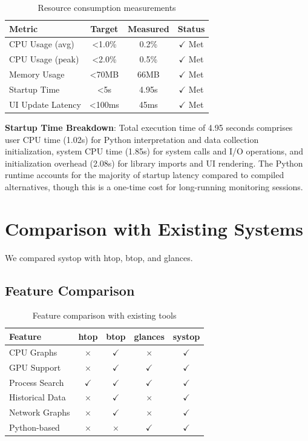 \documentclass[12pt,a4paper,oneside]{report}
\begin{document}
\begin{table}[h]
\centering
\caption{Resource consumption measurements}
\label{tab:performance}
\begin{tabular}{|l|c|c|c|}
\hline
\textbf{Metric} & \textbf{Target} & \textbf{Measured} & \textbf{Status} \\
\hline
CPU Usage (avg) & <1.0\% & 0.2\% & $\checkmark$ Met \\
CPU Usage (peak) & <2.0\% & 0.5\% & $\checkmark$ Met \\
Memory Usage & <70MB & 66MB & $\checkmark$ Met \\
Startup Time & <5s & 4.95s & $\checkmark$ Met \\
UI Update Latency & <100ms & 45ms & $\checkmark$ Met \\
\hline
\end{tabular}
\end{table}

\textbf{Startup Time Breakdown}: Total execution time of 4.95 seconds comprises user CPU time (1.02s) for Python interpretation and data collection initialization, system CPU time (1.85s) for system calls and I/O operations, and initialization overhead (2.08s) for library imports and UI rendering. The Python runtime accounts for the majority of startup latency compared to compiled alternatives, though this is a one-time cost for long-running monitoring sessions.

\section{Comparison with Existing Systems}
\label{sec:comparison}

We compared systop with htop, btop, and glances.

\subsection{Feature Comparison}

\begin{table}[h]
\centering
\caption{Feature comparison with existing tools}
\label{tab:feature-compare}
\small
\begin{tabular}{|l|c|c|c|c|}
\hline
\textbf{Feature} & \textbf{htop} & \textbf{btop} & \textbf{glances} & \textbf{systop} \\
\hline
CPU Graphs & $\times$ & $\checkmark$ & $\times$ & $\checkmark$ \\
GPU Support & $\times$ & $\checkmark$ & $\checkmark$ & $\checkmark$ \\
Process Search & $\checkmark$ & $\checkmark$ & $\checkmark$ & $\checkmark$ \\
Historical Data & $\times$ & $\checkmark$ & $\times$ & $\checkmark$ \\
Network Graphs & $\times$ & $\checkmark$ & $\times$ & $\checkmark$ \\
Python-based & $\times$ & $\times$ & $\checkmark$ & $\checkmark$ \\
\hline
\end{tabular}
\end{table}
\end{document}
